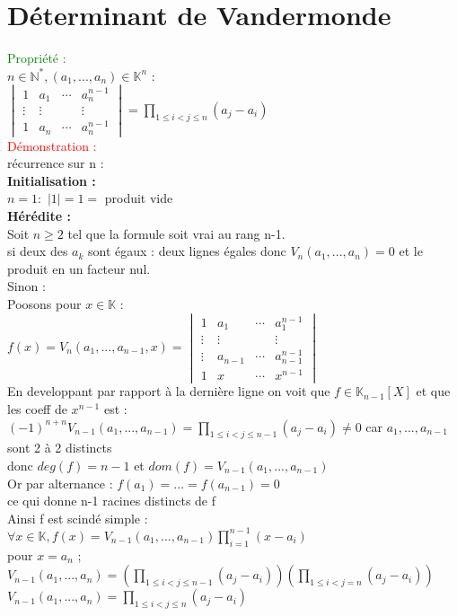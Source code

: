 \documentclass{article}
\begin{document}
\section{Déterminant de Vandermonde}
\textcolor{green}{Propriété :} \\
$n \in \mathbb N^*,(a_1,...,a_n)\in \mathbb K^n$ : \\
$\begin{vmatrix}
1 & a_1 & \cdots & a_n^{n-1} \\
\vdots & \vdots & &\vdots \\  1 & a_n & \cdots &a_n^{n-1}  \end{vmatrix} = \prod_{1 \leq i < j \leq n}(a_j-a_i)$ \\
\textcolor{red}{Démonstration :} \\
récurrence sur n : \\
{\bf Initialisation :} \\
$n=1 :$ $|1|=1=$ produit vide \\
{\bf Hérédite :} \\
Soit $n \geq 2$ tel que la formule soit vrai au rang n-1. \\
si deux des $a_k$ sont égaux : deux lignes égales donc $V_n(a_1,...,a_n)=0$ et le produit en un facteur nul. \\
Sinon : \\
Poosons pour $x \in \mathbb K$ : \\
$f(x)=V_n(a_1,...,a_{n-1},x) = \begin{vmatrix}
1 & a_1 &\cdots &a_1^{n-1} \\
\vdots & \vdots & &\vdots \\
\vdots & a_{n-1} & \cdots & a_{n-1}^{n-1} \\
1 & x & \cdots &x^{n-1}
\end{vmatrix}$ \\
En developpant par rapport à la dernière ligne on voit que $f \in \mathbb K_{n-1}[X]$ et que les coeff de $x^{n-1}$ est : \\
$(-1)^{n+n} V_{n-1}(a_1,...,a_{n-1}) = \prod_{1 \leq i < j \leq n-1} (a_j-a_i) \neq 0$ car $a_1,...,a_{n-1}$ sont 2 à 2 distincts \\
donc $deg(f)=n-1$ et $dom(f)=V_{n-1}(a_1,...,a_{n-1})$ \\
Or par alternance : $f(a_1)=...=f(a_{n-1})=0$ \\
ce qui donne n-1 racines distincts de f \\
Ainsi f est scindé simple : \\
$\forall x \in \mathbb K, f(x)=V_{n-1}(a_1,...,a_{n-1})\prod_{i=1}^{n-1}(x-a_i)$ \\
pour $x=a_n$ ;
$V_{n-1}(a_1,...,a_n)= (\prod_{1 \leq i<j \leq n-1}(a_j-a_i))(\prod_{1 \leq i <j = n}(a_j-a_i))$ \\
$V_{n-1}(a_1,...,a_n)= \prod_{1 \leq i <j \leq n} (a_j-a_i)$
\end{document}
